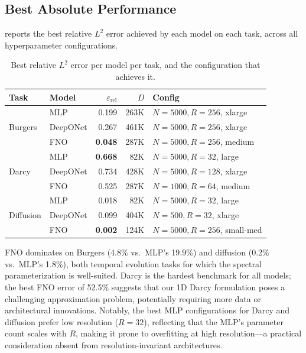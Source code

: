 \documentclass[11pt]{article}
\newcommand{\relLtwo}{\varepsilon_{\mathrm{rel}}}
\begin{document}
\subsection{Best Absolute Performance}
\label{sec:best}

 reports the best relative $L^2$ error achieved by each
model on each task, across all hyperparameter configurations.

\begin{table}[h]
\centering
\caption{Best relative $L^2$ error per model per task, and the
configuration that achieves it.}
\label{tab:best}
\begin{tabular}{@{}llrrl@{}}
\toprule
\textbf{Task} & \textbf{Model} & \textbf{$\relLtwo$} & $D$ &
\textbf{Config} \\
\midrule
\multirow{3}{*}{Burgers}
  & MLP      & 0.199 & 263K & $N\!=\!5000, R\!=\!256$, xlarge \\
  & DeepONet & 0.267 & 461K & $N\!=\!5000, R\!=\!256$, xlarge \\
  & FNO      & \textbf{0.048} & 287K & $N\!=\!5000, R\!=\!256$, medium \\
\midrule
\multirow{3}{*}{Darcy}
  & MLP      & \textbf{0.668} & 82K & $N\!=\!5000, R\!=\!32$, large \\
  & DeepONet & 0.734 & 428K & $N\!=\!5000, R\!=\!128$, xlarge \\
  & FNO      & 0.525 & 287K & $N\!=\!1000, R\!=\!64$, medium \\
\midrule
\multirow{3}{*}{Diffusion}
  & MLP      & 0.018 & 82K & $N\!=\!5000, R\!=\!32$, large \\
  & DeepONet & 0.099 & 404K & $N\!=\!500, R\!=\!32$, xlarge \\
  & FNO      & \textbf{0.002} & 124K & $N\!=\!5000, R\!=\!256$, small-med \\
\bottomrule
\end{tabular}
\end{table}

FNO dominates on Burgers (4.8\% vs.\ MLP's 19.9\%) and diffusion
(0.2\% vs.\ MLP's 1.8\%), both temporal evolution tasks for which the
spectral parameterization is well-suited. Darcy is the hardest benchmark
for all models; the best FNO error of 52.5\% suggests that our
1D Darcy formulation poses a challenging approximation problem,
potentially requiring more data or architectural innovations. Notably,
the best MLP configurations for Darcy and diffusion prefer low
resolution ($R = 32$), reflecting that the MLP's parameter count scales
with $R$, making it prone to overfitting at high resolution---a
practical consideration absent from resolution-invariant architectures.
\end{document}
